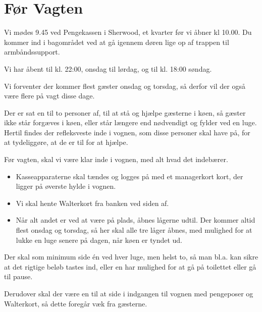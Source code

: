 \section{Før Vagten}
\label{sec:pre-vagten}

Vi mødes 9.45 ved Pengekassen i Sherwood, et kvarter før vi åbner kl 10.00.
Du kommer ind i bagområdet ved at gå igennem døren lige op af trappen til armbåndssupport.

Vi har åbent til kl. 22:00, onsdag til lørdag, og til kl. 18:00 søndag.

Vi forventer der kommer flest gæster onsdag og torsdag, 
så derfor vil der også være flere på vagt disse dage.

Der er sat en til to personer af, til at stå og hjælpe gæsterne i køen, 
så gæster ikke står forgæves i køen, eller står længere end nødvendigt og fylder ved en luge.
Hertil findes der refleksveste inde i vognen, som disse personer skal have på, 
for at tydeliggøre, at de er til for at hjælpe.

Før vagten, skal vi være klar inde i vognen, med alt hvad det indebærer. 
\begin{itemize}
	\item Kasseapparaterne skal tændes og logges på med et managerkort kort, der ligger på øverste hylde i vognen.
	\item Vi skal hente Walterkort fra banken ved siden af.
	\item Når alt andet er ved at være på plads, åbnes
	lågerne udtil. Der kommer altid flest onsdag og torsdag, så her skal alle tre låger åbnes, 
	med mulighed for at lukke en luge senere på dagen, når køen er tyndet ud.
\end{itemize}

Der skal som minimum side én ved hver luge, men helst to, så man bl.a. 
kan sikre at det rigtige beløb tastes ind, 
eller en har mulighed for at gå på toilettet eller gå til pause.

Derudover skal der være en til at side i indgangen til vognen med pengeposer og Walterkort, 
så dette foregår væk fra gæsterne.